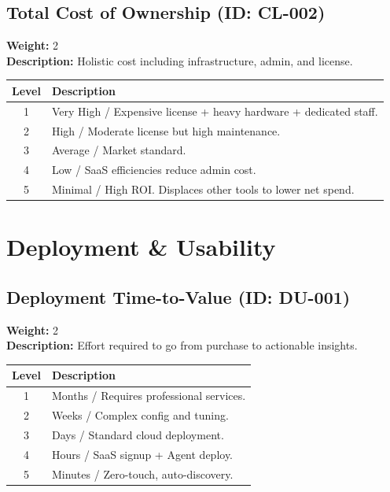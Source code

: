 \documentclass{article}
\begin{document}
\subsection{Total Cost of Ownership (ID: CL-002)}
\textbf{Weight:} 2 \\
\textbf{Description:} Holistic cost including infrastructure, admin, and license.
\vspace{0.3cm}
\begin{longtable}{|c|p{12cm}|}
\hline
\rowcolor{lightgray} \textbf{Level} & \textbf{Description} \\ \hline
1 & Very High / Expensive license + heavy hardware + dedicated staff. \\ \hline
2 & High / Moderate license but high maintenance. \\ \hline
3 & Average / Market standard. \\ \hline
4 & Low / SaaS efficiencies reduce admin cost. \\ \hline
5 & Minimal / High ROI. Displaces other tools to lower net spend. \\ \hline
\end{longtable}
\vspace{0.5cm}
\section{Deployment \& Usability}
\subsection{Deployment Time-to-Value (ID: DU-001)}
\textbf{Weight:} 2 \\
\textbf{Description:} Effort required to go from purchase to actionable insights.
\vspace{0.3cm}
\begin{longtable}{|c|p{12cm}|}
\hline
\rowcolor{lightgray} \textbf{Level} & \textbf{Description} \\ \hline
1 & Months / Requires professional services. \\ \hline
2 & Weeks / Complex config and tuning. \\ \hline
3 & Days / Standard cloud deployment. \\ \hline
4 & Hours / SaaS signup + Agent deploy. \\ \hline
5 & Minutes / Zero-touch, auto-discovery. \\ \hline
\end{longtable}
\vspace{0.5cm}
\end{document}
